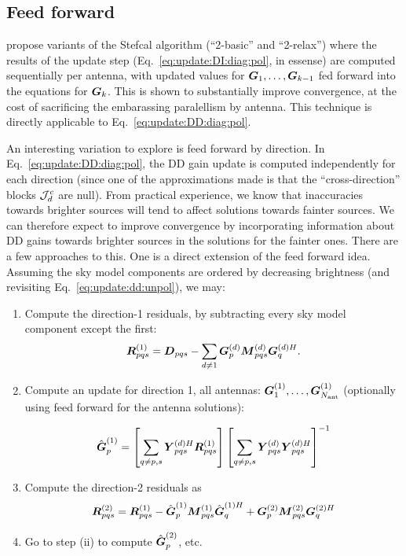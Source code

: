 \documentclass[useAMS,usenatbib]{mn2e}
\newcommand{\mat}[1]{{\bmath{#1}}}
\newcommand{\DD}{\mat{D}}
\newcommand{\MM}{\mat{M}}
\newcommand{\RR}{\mat{R}}
\newcommand{\GG}{\mat{G}}
\begin{document}
\subsection{Feed forward}
\label{sec:feed-forward}

\citet{Stefcal} propose variants of the Stefcal algorithm (``2-basic'' and ``2-relax'') where the results of the 
update step (Eq.~\ref{eq:update:DI:diag:pol}, in essense) are computed sequentially per antenna, with updated
values for $\GG_1,\dots,\GG_{k-1}$ fed forward into the equations for $\GG_k$. This is shown to 
substantially improve convergence, at the cost of sacrificing the embarassing paralellism by antenna. This technique 
is directly applicable to Eq.~\ref{eq:update:DD:diag:pol}. 

An interesting variation to explore is feed forward by direction. In Eq.~\ref{eq:update:DD:diag:pol}, the DD gain 
update is computed independently for each direction (since one of the approximations made is that the ``cross-direction''
blocks $\mathcal{J}^c_d$ are null). From practical experience, we know that inaccuracies towards brighter 
sources will tend to affect solutions towards fainter sources. We can therefore expect to improve convergence
by incorporating information about DD gains towards brighter sources in the solutions for the fainter ones. There are
a few approaches to this. One is a direct extension of the feed forward idea. Assuming 
the sky model components are ordered by decreasing brightness (and revisiting Eq.~\ref{eq:update:dd:unpol}), we may:

\begin{enumerate}
\item Compute the direction-1 residuals, by subtracting every sky model component except the first:
\[
  \RR^{(1)}_{pqs} = \DD_{pqs} - \sum\limits_{d\ne1} \GGd_p \MMd_{pqs} \GGdH_q .
\]
\item Compute an update for direction 1, all antennas: $\GG^{(1)}_1,\dots,\GG^{(1)}_{\Na}$ (optionally using feed forward
for the antenna solutions):

\[
\hat{\GG}^{(1)}_p = \left [ \sum\limits_{q\ne p,s} \YYdH_{pqs} \RR^{(1)}_{pqs} \right ] 
\left [ \sum\limits_{q\ne p,s} \YYd_{pqs} \YYdH_{pqs}  \right ]^{-1}
\]

\item Compute the direction-2 residuals as
\[
  \RR^{(2)}_{pqs} = \RR^{(1)}_{pqs} - \hat{\GG}^{(1)}_p \MM^{(1)}_{pqs} \hat{\GG}^{(1)H}_q + \GG^{(2)}_p \MM^{(2)}_{pqs} \GG^{(2)H}_q
\]

\item Go to step (ii) to compute $\hat{\GG}^{(2)}_p$, etc.

\end{enumerate}
\end{document}
